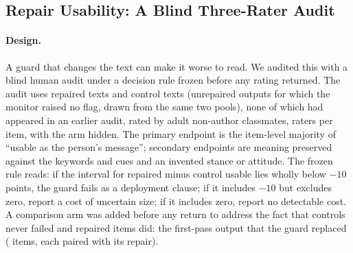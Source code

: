\subsection{Repair Usability: A Blind Three-Rater Audit}\label{sec:usability}

\paragraph{Design.}
A guard that changes the text can make it worse to read. We audited this with a blind human audit under a decision rule frozen before any rating returned. The audit uses \jmpOneSevenItemsPerArm{} repaired texts and \jmpOneSevenItemsPerArm{} control texts (unrepaired outputs for which the monitor raised no flag, drawn from the same two pools), none of which had appeared in an earlier audit, rated by \jmpOneSevenRaters{} adult non-author classmates, \jmpOneSevenPerItem{} raters per item, with the arm hidden. The primary endpoint is the item-level majority of ``usable as the person's message''; secondary endpoints are meaning preserved against the keywords and cues and an invented stance or attitude. The frozen rule reads: if the interval for repaired minus control usable lies wholly below $-10$ points, the guard fails as a deployment clause; if it includes $-10$ but excludes zero, report a cost of uncertain size; if it includes zero, report no detectable cost. A comparison arm was added before any return to address the fact that controls never failed and repaired items did: the first-pass output that the guard replaced (\jmpOneSevenOrigItems{} items, each paired with its repair).

